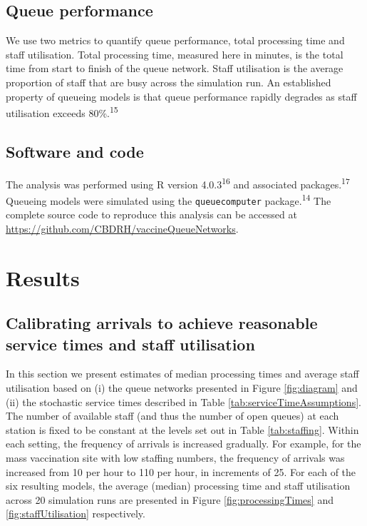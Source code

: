 \documentclass{article}
\begin{document}
\hypertarget{queue-performance}{%
\subsection{Queue performance}\label{queue-performance}}

We use two metrics to quantify queue performance, total processing time
and staff utilisation. Total processing time, measured here in minutes,
is the total time from start to finish of the queue network. Staff
utilisation is the average proportion of staff that are busy across the
simulation run. An established property of queueing models is that queue
performance rapidly degrades as staff utilisation exceeds
80\%.\textsuperscript{15}

\hypertarget{software-and-code}{%
\subsection{Software and code}\label{software-and-code}}

The analysis was performed using R version 4.0.3\textsuperscript{16} and
associated packages.\textsuperscript{17} Queueing models were simulated
using the \texttt{queuecomputer} package.\textsuperscript{14} The
complete source code to reproduce this analysis can be accessed at
\url{https://github.com/CBDRH/vaccineQueueNetworks}.

\hypertarget{results}{%
\section{Results}\label{results}}

\hypertarget{calibrating-arrivals-to-achieve-reasonable-service-times-and-staff-utilisation}{%
\subsection{Calibrating arrivals to achieve reasonable service times and
staff
utilisation}\label{calibrating-arrivals-to-achieve-reasonable-service-times-and-staff-utilisation}}

In this section we present estimates of median processing times and
average staff utilisation based on (i) the queue networks presented in
Figure \ref{fig:diagram} and (ii) the stochastic service times described
in Table \ref{tab:serviceTimeAssumptions}. The number of available staff
(and thus the number of open queues) at each station is fixed to be
constant at the levels set out in Table \ref{tab:staffing}. Within each
setting, the frequency of arrivals is increased gradually. For example,
for the mass vaccination site with low staffing numbers, the frequency
of arrivals was increased from 10 per hour to 110 per hour, in
increments of 25. For each of the six resulting models, the average
(median) processing time and staff utilisation across 20 simulation runs
are presented in Figure \ref{fig:processingTimes} and
\ref{fig:staffUtilisation} respectively.
\end{document}
